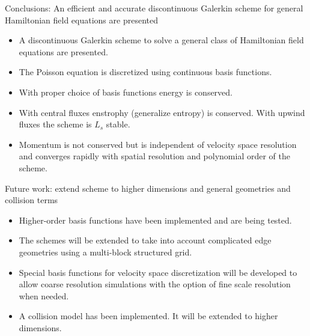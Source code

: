 \documentclass[pdf]{beamer}
\theoremstyle{definition}
\begin{document}
\begin{frame}{Conclusions: An efficient and accurate discontinuous
    Galerkin scheme for general Hamiltonian field equations are
    presented}%

  \begin{itemize}
  \item A discontinuous Galerkin scheme to solve a general class of
    Hamiltonian field equations are presented.
  \item The Poisson equation is discretized using continuous basis
    functions.
  \item With proper choice of basis functions energy is
    conserved. 
  \item With central fluxes enstrophy (generalize entropy) is
    conserved. With upwind fluxes the scheme is $L_s$ stable.
  \item Momentum is not conserved but is independent of velocity space
    resolution and converges rapidly with spatial resolution and
    polynomial order of the scheme.
  \end{itemize}

\end{frame}

\begin{frame}{Future work: extend scheme to higher dimensions and
    general geometries and collision terms}%

  \begin{itemize}
  \item Higher-order basis functions have been implemented and are
    being tested.
  \item The schemes will be extended to take into account complicated
    edge geometries using a multi-block structured grid.
  \item Special basis functions for velocity space discretization will
    be developed to allow coarse resolution simulations with the
    option of fine scale resolution when needed.
  \item A collision model has been implemented. It will be extended to
    higher dimensions.
  \end{itemize}

\end{frame}
\end{document}

